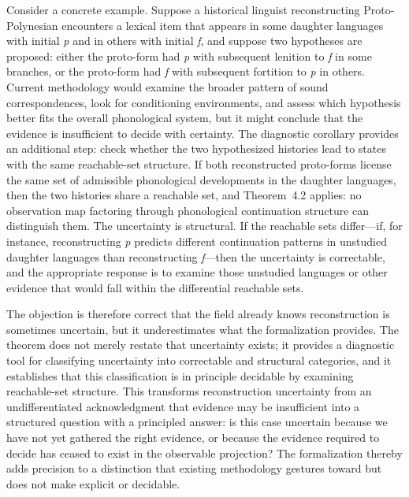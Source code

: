 Consider a concrete example. Suppose a historical linguist reconstructing Proto-Polynesian encounters a lexical item that appears in some daughter languages with initial \textit{p} and in others with initial \textit{f}, and suppose two hypotheses are proposed: either the proto-form had \textit{p} with subsequent lenition to \textit{f} in some branches, or the proto-form had \textit{f} with subsequent fortition to \textit{p} in others. Current methodology would examine the broader pattern of sound correspondences, look for conditioning environments, and assess which hypothesis better fits the overall phonological system, but it might conclude that the evidence is insufficient to decide with certainty. The diagnostic corollary provides an additional step: check whether the two hypothesized histories lead to states with the same reachable-set structure. If both reconstructed proto-forms license the same set of admissible phonological developments in the daughter languages, then the two histories share a reachable set, and Theorem~4.2 applies: no observation map factoring through phonological continuation structure can distinguish them. The uncertainty is structural. If the reachable sets differ—if, for instance, reconstructing \textit{p} predicts different continuation patterns in unstudied daughter languages than reconstructing \textit{f}—then the uncertainty is correctable, and the appropriate response is to examine those unstudied languages or other evidence that would fall within the differential reachable sets.

The objection is therefore correct that the field already knows reconstruction is sometimes uncertain, but it underestimates what the formalization provides. The theorem does not merely restate that uncertainty exists; it provides a diagnostic tool for classifying uncertainty into correctable and structural categories, and it establishes that this classification is in principle decidable by examining reachable-set structure. This transforms reconstruction uncertainty from an undifferentiated acknowledgment that evidence may be insufficient into a structured question with a principled answer: is this case uncertain because we have not yet gathered the right evidence, or because the evidence required to decide has ceased to exist in the observable projection? The formalization thereby adds precision to a distinction that existing methodology gestures toward but does not make explicit or decidable.
